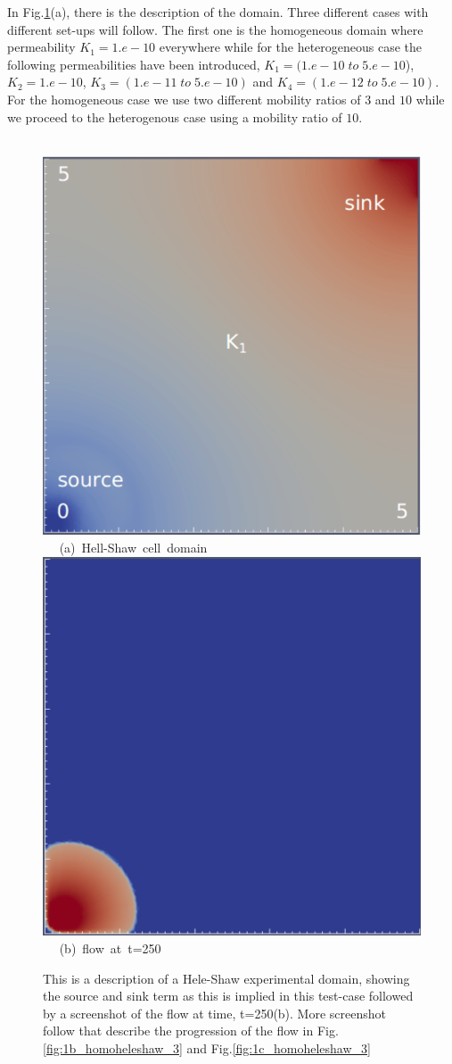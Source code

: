 \documentclass[preprint,authoryear,12pt]{elsarticle}
\begin{document}
\medskip
In Fig.\ref{fig:1a_homoheleshaw_3}(a), there is the description of the domain. Three different cases with different set-ups will follow. The first one is the homogeneous domain where permeability $K_{1}=1.e-10$ everywhere while for the heterogeneous case the following permeabilities have been introduced, $K_{1}=(1.e-10 \;to\; 5.e-10$), $K_{2}=1.e-10$, $K_{3}=(1.e-11 \;to\; 5.e-10)$ and $K_{4}=(1.e-12 \;to\; 5.e-10)$. For the homogeneous case we use two different mobility ratios of $3$ and $10$ while we proceed to the heterogenous case using a mobility ratio of $10$. 

\begin{figure}[h]
\vbox{
\hbox{\hspace{3.5cm}
\includegraphics[width=.5\textwidth]{./Pics1/Saffman_homogeneous_MR3/saffman_homo_fixed_1.pdf} 
}
\vspace{0.0cm}
\hbox{\hspace{5.0cm} (a) Hell-Shaw cell domain   
}
\vspace{0.25cm}
\hbox{\hspace{3.5cm}
\includegraphics[width=.5\textwidth]{./Pics1/Saffman_homogeneous_MR3/saffman_homo_fixed_250.pdf}
}
\vspace{0.0cm}
\hbox{\hspace{5.0cm} (b) flow at t=250  
}
}     
\caption{This is a description of a Hele-Shaw experimental domain, showing the source and sink term as this is implied in this test-case followed by a screenshot of the flow at time, t=250(b). More screenshot follow that describe the progression of the flow in Fig.\ref{fig:1b_homoheleshaw_3} and Fig.\ref{fig:1c_homoheleshaw_3}}
\label{fig:1a_homoheleshaw_3}
\end{figure}
\end{document}
